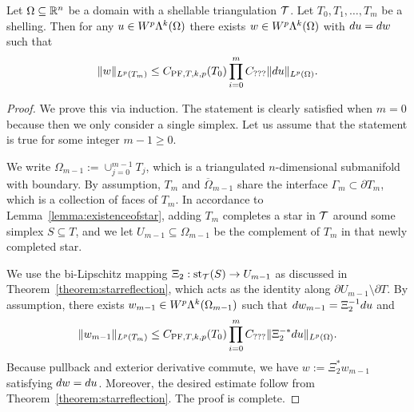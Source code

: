 \documentclass[10pt,letterpaper]{article}
\begin{document}
\begin{theorem}\label{theorem:poincarefriedrichsestimate:exterior}
    Let $\Omega \subseteq {\mathbb R}^{n}$ be a domain with a shellable triangulation ${\mathcal T}$.
    Let $T_0, T_1, \dots, T_m$ be a shelling.
    Then for any $u \in W^{p}\Lambda^{k}(\Omega)$ 
    there exists $w \in W^{p}\Lambda^{k}(\Omega)$ with $d u = d w$ 
    such that 
    \begin{align*}
        \| w \|_{L^{p}(T_{m})}
        \leq 
        C_{{\rm PF},T,k,p}(T_{0})
        \prod_{i=0}^{m} 
        C_{???}
        \| d u \|_{L^{p}(\Omega)}
        .
    \end{align*}
\end{theorem}
\begin{proof}
    We prove this via induction. 
    The statement is clearly satisfied when $m=0$ because then we only consider a single simplex. 
    Let us assume that the statement is true for some integer $m-1 \geq 0$.
    
    We write $\Omega_{m-1} := \cup_{j=0}^{m-1} T_{j}$, 
    which is a triangulated $n$-dimensional submanifold with boundary.
    By assumption, $T_{m}$ and $\overline\Omega_{m-1}$ share the interface $\Gamma_{m} \subset \partial T_{m}$, 
    which is a collection of faces of $T_{m}$. 
    In accordance to Lemma~\ref{lemma:existenceofstar}, adding $T_{m}$ completes a star in ${\mathcal T}$ around some simplex $S \subseteq T$, 
    and we let $U_{m-1} \subseteq \Omega_{m-1}$ be the complement of $T_{m}$ in that newly completed star. 
    
    We use the bi-Lipschitz mapping $\Xi_{2} : \operatorname{st}_{{\mathcal T}}(S) \rightarrow U_{m-1}$ as discussed in Theorem~\ref{theorem:starreflection},
    which acts as the identity along $\partial U_{m-1} \setminus \partial T$.
    By assumption, 
    there exists $w_{m-1} \in W^{p}\Lambda^{k}(\Omega_{m-1})$ 
    such that $d w_{m-1} = \Xi_{2}^{-1} d u$ and 
    \begin{align*}
        \| w_{m-1} \|_{L^{p}(T_{m})}
        \leq 
        C_{{\rm PF},T,k,p}(T_{0})
        \prod_{i=0}^{m} 
        C_{???}
        \| \Xi_{2}^{-\ast} d u \|_{L^{p}(\Omega)}
        .
    \end{align*}
    Because pullback and exterior derivative commute, 
    we have $w := \Xi_{2}^{\ast} w_{m-1}$ satisfying $d w = d u$. 
    Moreover, the desired estimate follow from Theorem~\ref{theorem:starreflection}.
    The proof is complete. 
\end{proof}
\end{document}
